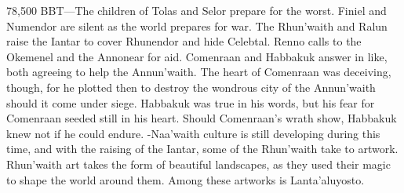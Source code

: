 \documentclass[smalldemyvopaper,11pt,twoside,onecolumn,openright,extrafontsizes]{memoir}
\begin{document}
78,500 BBT—The children of Tolas and Selor prepare for the worst. Finiel and Numendor are silent as the world prepares for war. The Rhun’waith and Ralun raise the Iantar to cover Rhunendor and hide Celebtal. Renno calls to the Okemenel and the Annonear for aid. Comenraan and Habbakuk answer in like, both agreeing to help the Annun’waith. The heart of Comenraan was deceiving, though, for he plotted then to destroy the wondrous city of the Annun’waith should it come under siege. Habbakuk was true in his words, but his fear for Comenraan seeded still in his heart. Should Comenraan’s wrath show, Habbakuk knew not if he could endure.
-Naa’waith culture is still developing during this time, and with the raising of the Iantar, some of the Rhun’waith take to artwork. Rhun’waith art takes the form of beautiful landscapes, as they used their magic to shape the world around them. Among these artworks is Lanta’aluyosto.
\end{document}
